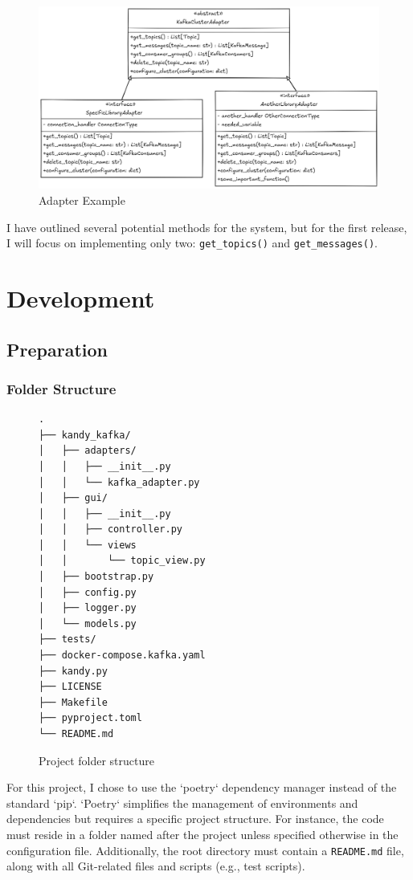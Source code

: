\documentclass[10pt , a4paper]{report}
\begin{document}
\begin{figure}[htpb]
    \centering
    \includegraphics[width=1\linewidth]{imgs/AdapterUML.png}
    \caption{Adapter Example}\label{fig:AdapterUML}
\end{figure}

I have outlined several potential methods for the system, but for the first release, I will focus on implementing only two: \texttt{get\_topics()} and \texttt{get\_messages()}.

\chapter{Development}
\section{Preparation}

\subsection{Folder Structure}

\begin{figure}[htbp]
\centering
\begin{BVerbatim}
.
├── kandy_kafka/
│   ├── adapters/
│   │   ├── __init__.py
│   │   └── kafka_adapter.py
│   ├── gui/
│   │   ├── __init__.py
│   │   ├── controller.py
│   │   └── views
│   │       └── topic_view.py
│   ├── bootstrap.py
│   ├── config.py
│   ├── logger.py
│   └── models.py
├── tests/
├── docker-compose.kafka.yaml
├── kandy.py
├── LICENSE
├── Makefile
├── pyproject.toml
└── README.md
\end{BVerbatim}
\caption{Project folder structure}
\end{figure}

For this project, I chose to use the `poetry` dependency manager instead of the standard `pip`. `Poetry` simplifies the management of environments and dependencies but requires a specific project structure. For instance, the code must reside in a folder named after the project unless specified otherwise in the configuration file. Additionally, the root directory must contain a \texttt{README.md} file, along with all Git-related files and scripts (e.g., test scripts). 
\end{document}
